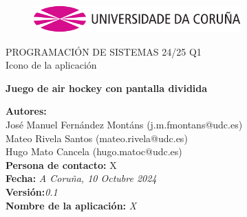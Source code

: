 \documentclass[a4paper,openright,12pt]{article}
\begin{document}
\begin{titlepage}

\begin{center}
\vspace*{-1in}
\begin{figure}[htb]
\begin{center}
\includegraphics[width=8cm]{udc.eps}
\end{center}
\end{figure}

\vspace*{1in}
PROGRAMACIÓN DE SISTEMAS 24/25 Q1\\
Icono de la aplicación\\
\vspace*{1in}
\begin{Large}
\textbf{Juego de air hockey con pantalla dividida} \\
\end{Large}

\vspace*{3in}

\begin{large}
\raggedleft
\textbf{Autores:}\\ José Manuel Fernández Montáns (j.m.fmontans@udc.es) \\
Mateo Rivela Santos (mateo.rivela@udc.es)\\
Hugo Mato Cancela (hugo.matoc@udc.es)\\
\textbf{Persona de contacto:} X\\
\textbf{Fecha:}\textit{ A Coruña, 10 Octubre 2024}\\
\textbf{Versión:}\textit{0.1}\\
\textbf{Nombre de la aplicación:} \textit{X}\\
\end{large}

\end{center}
\end{titlepage} 

\newpage

\end{document}
